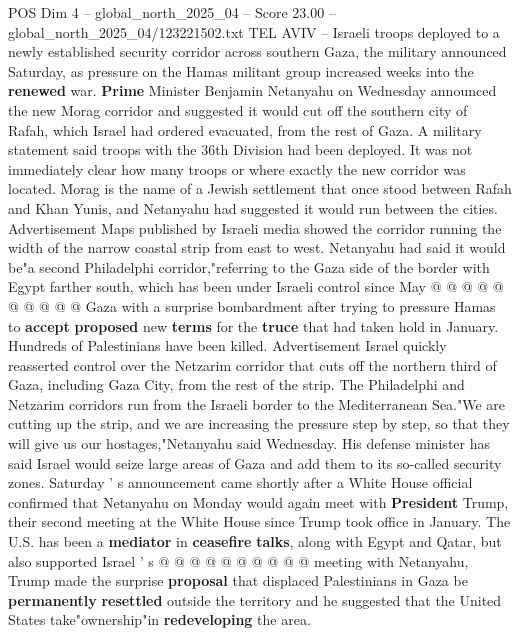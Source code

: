 \begin{textsample}{POS Dim 4 – global\_north\_2025\_04 – Score 23.00 – global\_north\_2025\_04/123221502.txt}  \label{ex:f4_pos_216}
TEL AVIV -- Israeli troops deployed to a newly established security corridor across southern Gaza, the military announced Saturday, as pressure on the Hamas militant group increased weeks into the \textbf{renewed} war. \textbf{Prime} Minister Benjamin Netanyahu on Wednesday announced the new Morag corridor and suggested it would cut off the southern city of Rafah, which Israel had ordered evacuated, from the rest of Gaza.
A military statement said troops with the 36th Division had been deployed.
It was not immediately clear how many troops or where exactly the new corridor was located.
Morag is the name of a Jewish settlement that once stood between Rafah and Khan Yunis, and Netanyahu had suggested it would run between the cities.
Advertisement Maps published by Israeli media showed the corridor running the width of the narrow coastal strip from east to west.
Netanyahu had said it would be"a second Philadelphi corridor,"referring to the Gaza side of the border with Egypt farther south, which has been under Israeli control since May @ @ @ @ @ @ @ @ @ @ Gaza with a surprise bombardment after trying to pressure Hamas to \textbf{accept} \textbf{proposed} new \textbf{terms} for the \textbf{truce} that had taken hold in January.
Hundreds of Palestinians have been killed.
Advertisement Israel quickly reasserted control over the Netzarim corridor that cuts off the northern third of Gaza, including Gaza City, from the rest of the strip.
The Philadelphi and Netzarim corridors run from the Israeli border to the Mediterranean Sea."We are cutting up the strip, and we are increasing the pressure step by step, so that they will give us our hostages,"Netanyahu said Wednesday.
His defense minister has said Israel would seize large areas of Gaza and add them to its so-called security zones.
Saturday ' s announcement came shortly after a White House official confirmed that Netanyahu on Monday would again meet with \textbf{President} Trump, their second meeting at the White House since Trump took office in January.
The U.S. has been a \textbf{mediator} in \textbf{ceasefire} \textbf{talks}, along with Egypt and Qatar, but also supported Israel ' s @ @ @ @ @ @ @ @ @ @ meeting with Netanyahu, Trump made the surprise \textbf{proposal} that displaced Palestinians in Gaza be \textbf{permanently} \textbf{resettled} outside the territory and he suggested that the United States take"ownership"in \textbf{redeveloping} the area.

\end{textsample}

